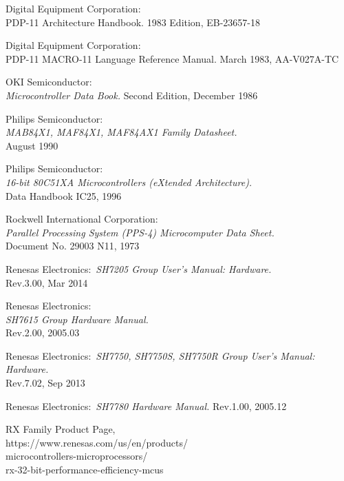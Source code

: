  Digital Equipment Corporation: \\
                  { PDP-11 Architecture Handbook.}
                  1983 Edition, EB-23657-18

 Digital Equipment Corporation: \\
                  { PDP-11 MACRO-11 Language Reference Manual.}
                  March 1983, AA-V027A-TC

 OKI Semiconductor: \\
                {\em Microcontroller Data Book.\/}
                Second Edition, December 1986

 Philips Semiconductor: \\
                 {\em MAB84X1, MAF84X1, MAF84AX1 Family Datasheet.} \\
                 August 1990

 Philips Semiconductor: \\
                 {\em 16-bit 80C51XA Microcontrollers (eXtended
                  Architecture).\/} \\
                 Data Handbook IC25, 1996

 Rockwell International Corporation: \\
                  {\em Parallel Processing System (PPS-4) Microcomputer Data Sheet.} \\
                 Document No. 29003 N11, 1973

 Renesas Electronics:\
                {\em SH7205 Group User's Manual: Hardware.} \\
                Rev.3.00, Mar 2014

 Renesas Electronics: \\
                 {\em SH7615 Group Hardware Manual.\/} \\
                 Rev.2.00, 2005.03
 
 Renesas Electronics:\
                {\em SH7750, SH7750S, SH7750R Group User's Manual: Hardware.} \\
                Rev.7.02, Sep 2013
 
 Renesas Electronics:\
                {\em SH7780 Hardware Manual.}
                Rev.1.00, 2005.12
 
\bibitem{RxOverview} RX Family Product Page, \\
                 https://www.renesas.com/us/en/products/ \\
                 microcontrollers-microprocessors/ \\
                 rx-32-bit-performance-efficiency-mcus

